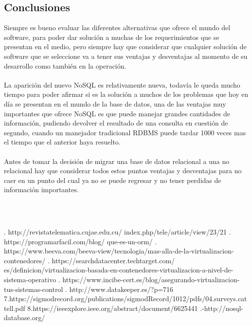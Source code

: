 \documentclass[twoside,twocolumn]{article}
\begin{document}
\begin{flushright}
\begin{itemize}
\section{Conclusiones}
Siempre es bueno evaluar las diferentes alternativas que ofrece el mundo del software, para poder dar solución a muchas de los requerimientos que se presentan en el medio, pero siempre hay que considerar que cualquier solución de software que se seleccione va a tener sus ventajas y desventajas al momento de su desarrollo como también en la operación.\textbf{}\\
\textbf{}\\
La aparición del nuevo NoSQL es relativamente nueva, todavía le queda mucho tiempo para poder afirmar si es la solución a muchos de los problemas que hoy en día se presentan en el mundo de la base de datos, una de las ventajas muy importantes que ofrece NoSQL es que puede manejar grandes cantidades de información, pudiendo devolver el resultado de una consulta en cuestión de segundo, cuando un manejador tradicional RDBMS puede tardar 1000 veces mas el tiempo que el anterior haya resuelto. \textbf{}\\
\textbf{}\\
Antes de tomar la decisión de migrar una base de datos relacional a una no relacional hay que considerar todos estos puntos ventajas y desventajas para no caer en un punto del cual ya no se puede regresar y no tener perdidas de información importantes.




\textbf{}\\
\textbf{}\\

\begin{thebibliography}{99} %



. http://revistatelematica.cujae.edu.cu/
index.php/tele/article/view/23/21
 \break
{}. https://programarfacil.com/blog/
que-es-un-orm/
\break
{}. https://www.beeva.com/beeva-view/tecnologia/mas-alla-de-la-virtualizacion-contenedores/
\break
{}. https://searchdatacenter.techtarget.com/
es/definicion/virtualizacion-basada-en-contenedores-virtualizacion-a-nivel-de-sistema-operativo
\break
{}. https://www.incibe-cert.es/blog/asegurando-virtualizacion-tus-sistemas-control
\break
{}. http://www.datakeeper.es/?p=716
\break
\newblock
7.https://sigmodrecord.org/publications/sigmodRecord/1012/pdfs/04.surveys.cattell.pdf
\break
\newblock
8.https://ieeexplore.ieee.org/abstract/document/6625441
\break
{}.-http://nosql-database.org/
\break
\newblock {\em }
 
\end{thebibliography}

\end{itemize}
\end{flushright}
\end{document}
